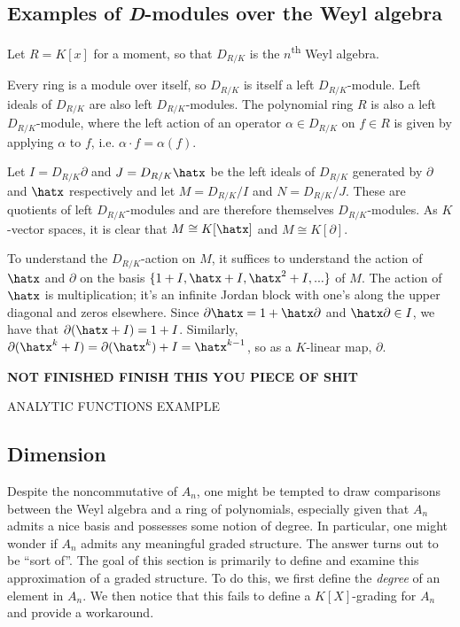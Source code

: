 \subsection{Examples of \emph{D}-modules over the Weyl algebra}
Let $R = K[x]$ for a moment, so that $D_{R/K}$ is the $n$\textsuperscript{th} Weyl algebra.
\begin{example}\label{example:Weyl-algebra-is-D-mod}
	Every ring is a module over itself, so $D_{R/K}$ is itself a left $D_{R/K}$-module. Left ideals of $D_{R/K}$ are also left $D_{R/K}$-modules. The polynomial ring $R$ is also a left $D_{R/K}$-module, where the left action of an operator $\alpha \in D_{R/K}$ on $f \in R$ is given by applying $\alpha$ to $f$, i.e. $\alpha\cdot f = \alpha(f)$.
\end{example}
\begin{example}\label{example:quotient-by-x-and-partial}
	Let $I = D_{R/K}\partial$ and $J = D_{R/K}\hatx$ be the left ideals of $D_{R/K}$ generated by $\partial$ and $\hatx$ respectively and let $M = D_{R/K}/I$ and $N = D_{R/K}/J$. These are quotients of left $D_{R/K}$-modules and are therefore themselves $D_{R/K}$-modules. As $K$-vector spaces, it is clear that $M \cong K[\hatx]$ and $M \cong K[\partial]$.

	To understand the $D_{R/K}$-action on $M$, it suffices to understand the action of $\hatx$ and $\partial$ on the basis $\{1+I,\hatx + I,\hatx^2 + I,...\}$ of $M$. The action of $\hatx$ is multiplication; it's an infinite Jordan block with one's along the upper diagonal and zeros elsewhere. Since $\partial\hatx = 1 + \hatx\partial$ and $\hatx\partial \in I$, we have that $\partial(\hatx + I) = 1 + I$. Similarly, $\partial(\hatx^k + I) = \partial(\hatx^k) + I = \hatx^{k-1}$, so as a $K$-linear map, $\partial$.

	\textbf{NOT FINISHED FINISH THIS YOU PIECE OF SHIT}
\end{example}
\begin{example}\label{example:analytic-functions}
	ANALYTIC FUNCTIONS EXAMPLE
\end{example}

\subsection{Dimension}

Despite the noncommutative of $A_n$, one might be tempted to draw comparisons between the Weyl algebra and a ring of polynomials, especially given that $A_n$ admits a nice basis and possesses some notion of degree. In particular, one might wonder if $A_n$ admits any meaningful graded structure. The answer turns out to be ``sort of''. The goal of this section is primarily to define and examine this approximation of a graded structure. To do this, we first define the \emph{degree} of an element in $A_n$. We then notice that this fails to define a $K[X]$-grading for $A_n$ and provide a workaround.

